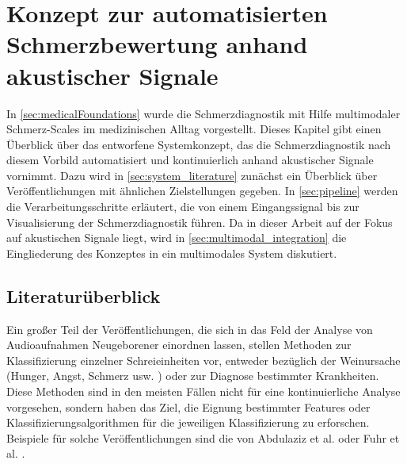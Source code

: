 \chapter{Konzept zur automatisierten Schmerzbewertung anhand akustischer Signale}
\label{sec:concept}

In \autoref{sec:medicalFoundations} wurde die Schmerzdiagnostik mit Hilfe multimodaler Schmerz-Scales im medizinischen Alltag vorgestellt. Dieses Kapitel gibt einen Überblick über das entworfene Systemkonzept, das die Schmerzdiagnostik nach diesem Vorbild automatisiert und kontinuierlich anhand akustischer Signale vornimmt. Dazu wird in \autoref{sec:system_literature} zunächst ein Überblick über Veröffentlichungen mit ähnlichen Zielstellungen gegeben. In \autoref{sec:pipeline} werden die Verarbeitungsschritte erläutert, die von einem Eingangssignal bis zur Visualisierung der Schmerzdiagnostik führen. Da in dieser Arbeit auf der Fokus auf akustischen Signale liegt, wird in \autoref{sec:multimodal_integration} die Eingliederung des Konzeptes in ein multimodales System diskutiert.

\section{Literaturüberblick}
\label{sec:system_literature}

Ein großer Teil der Veröffentlichungen, die sich in das Feld der Analyse von Audioaufnahmen Neugeborener einordnen lassen, stellen Methoden zur Klassifizierung einzelner Schreieinheiten vor, entweder bezüglich der Weinursache (Hunger, Angst, Schmerz usw. ) oder zur Diagnose bestimmter Krankheiten. Diese Methoden sind in den meisten Fällen nicht für eine kontinuierliche Analyse vorgesehen, sondern haben das Ziel, die Eignung bestimmter Features oder Klassifizierungsalgorithmen für die jeweiligen Klassifizierung zu erforschen. Beispiele für solche Veröffentlichungen sind die von Abdulaziz et al. \cite{class_abdulaziz} oder Fuhr et al. \cite{comparisonOfLearning}.


